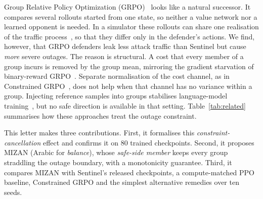 \documentclass[journal]{IEEEtran}
\begin{document}
Group Relative Policy Optimization (GRPO)~\cite{shao2024deepseekmath} looks like a natural successor. It compares several rollouts started from one state, so neither a value network nor a learned opponent is needed. In a simulator these rollouts can share one realisation of the traffic process~\cite{ng2000pegasus}, so that they differ only in the defender's actions. We find, however, that GRPO defenders leak less attack traffic than Sentinel but cause \emph{more} severe outages. The reason is structural. A cost that every member of a group incurs is removed by the group mean, mirroring the gradient starvation of binary-reward GRPO~\cite{nie2026starvation,yu2025dapo}. Separate normalisation of the cost channel, as in Constrained GRPO~\cite{girgis2026cgrpo}, does not help when that channel has no variance within a group. Injecting reference samples into groups stabilises language-model training~\cite{yan2025luffy,armor2026}, but no safe direction is available in that setting. Table~\ref{tab:related} summarises how these approaches treat the outage constraint.

\begin{table}[t]
\centering
\caption{Treatment of the Outage Constraint by Related Approaches}
\label{tab:related}
\setlength{\tabcolsep}{2.5pt}
\end{table}

This letter makes three contributions. First, it formalises this \emph{constraint-cancellation} effect and confirms it on 80 trained checkpoints. Second, it proposes MIZAN (Arabic for \emph{balance}), whose \emph{safe-side member} keeps every group straddling the outage boundary, with a monotonicity guarantee. Third, it compares MIZAN with Sentinel's released checkpoints, a compute-matched PPO baseline, Constrained GRPO and the simplest alternative remedies over ten seeds.
\end{document}
